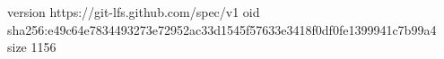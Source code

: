 version https://git-lfs.github.com/spec/v1
oid sha256:e49c64e7834493273e72952ac33d1545f57633e3418f0df0fe1399941c7b99a4
size 1156

